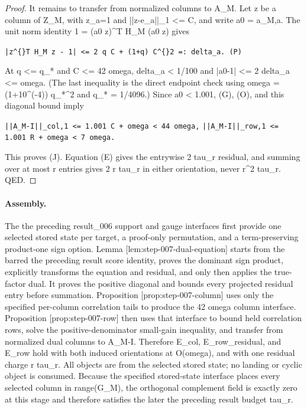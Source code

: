 \begin{proposition}
\begin{proof}
It remains to transfer from normalized columns to A\_M.  Let z be a column
of Z\_M, with z\_a=1 and ||z-e\_a||\_1 <= C, and write a0 = a\_M,a.  The unit
norm identity 1 = (a0 z)\textasciicircum{}T H\_M (a0 z) gives

\texttt{|z\textasciicircum\{\}T H\_M z - 1| <= 2 q C + (1+q) C\textasciicircum\{\}2 =: delta\_a.              (P)}

At q <= q\_* and C <= 42 omega, delta\_a < 1/100 and
|a0-1| <= 2 delta\_a <= omega.  (The last inequality is the direct endpoint
check using omega = (1+10\textasciicircum{}(-4)) q\_*\textasciicircum{}2 and q\_* = 1/4096.)
Since a0 < 1.001, (G), (O), and this diagonal bound imply

\texttt{||A\_M-I||\_col,1 <= 1.001 C + omega < 44 omega,}
\texttt{||A\_M-I||\_row,1 <= 1.001 R + omega < 7 omega.}

This proves (J).  Equation (E) gives the entrywise 2 tau\_r residual, and
summing over at most r entries gives 2 r tau\_r in either orientation, never
r\textasciicircum{}2 tau\_r.  QED.

\end{proof}
\end{proposition}
\paragraph{Assembly.}

The the preceding result\_006 support and gauge interfaces first provide one selected
stored state per target, a proof-only permutation, and a term-preserving
product-one sign option.  Lemma [lem:step-007-dual-equation] starts from the
barred the preceding result score identity, proves the dominant sign product, explicitly
transforms the equation and residual, and only then applies the true-factor
dual.  It proves the positive diagonal and bounds every projected residual
entry before summation.  Proposition [prop:step-007-column] uses
only the specified per-column correlation tails to produce the 42 omega
column interface.  Proposition [prop:step-007-row] then uses that interface
to bound held correlation rows, solve the positive-denominator small-gain
inequality, and transfer from normalized dual columns to A\_M-I.  Therefore
E\_col, E\_row\_residual, and E\_row hold with both induced orientations at
O(omega), and with one residual charge r tau\_r.  All objects are from the
selected stored state; no landing or cyclic object is consumed.
Because the specified stored-state interface places every selected column in
range(G\_M), the orthogonal complement field is exactly zero at this stage
and therefore satisfies the later the preceding result budget tau\_r.

